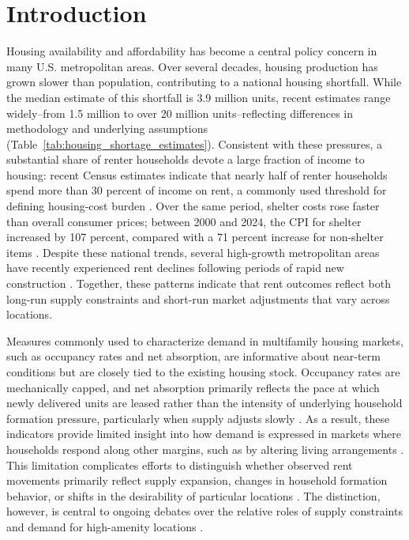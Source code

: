 \documentclass[pdflatex,sn-apa]{sn-jnl}%
\theoremstyle{thmstyleone}%
\theoremstyle{thmstyletwo}%
\theoremstyle{thmstylethree}%
\begin{document}


\maketitle


\section{Introduction}\label{sec1}
Housing availability and affordability has become a central policy concern in many U.S. metropolitan areas. Over several decades, housing production has grown slower than population, contributing to a national housing shortfall. While the median estimate of this shortfall is 3.9 million units, recent estimates range widely--from 1.5 million to over 20 million units--reflecting differences in methodology and underlying assumptions (Table~\ref{tab:housing_shortage_estimates}). Consistent with these pressures, a substantial share of renter households devote a large fraction of income to housing: recent Census estimates indicate that nearly half of renter households spend more than 30 percent of income on rent, a commonly used threshold for defining housing-cost burden \cite{censusNearlyHalf}. Over the same period, shelter costs rose faster than overall consumer prices; between 2000 and 2024, the CPI for shelter increased by 107 percent, compared with a 71 percent increase for non-shelter items \cite{stlouisfedConsumerPrice}. Despite these national trends, several high-growth metropolitan areas have recently experienced rent declines following periods of rapid new construction \cite{mott2024ThisRegion}. Together, these patterns indicate that rent outcomes reflect both long-run supply constraints and short-run market adjustments that vary across locations.

Measures commonly used to characterize demand in multifamily housing markets, such as occupancy rates and net absorption, are informative about near-term conditions but are closely tied to the existing housing stock. Occupancy rates are mechanically capped, and net absorption primarily reflects the pace at which newly delivered units are leased rather than the intensity of underlying household formation pressure, particularly when supply adjusts slowly \cite{mueller1999real}. As a result, these indicators provide limited insight into how demand is expressed in markets where households respond along other margins, such as by altering living arrangements \cite{gabriel2001rental, sirmans1991determinants, pyhrr1999real}. This limitation complicates efforts to distinguish whether observed rent movements primarily reflect supply expansion, changes in household formation behavior, or shifts in the desirability of particular locations \cite{pennington2021does, molloy2022housing}. The distinction, however, is central to ongoing debates over the relative roles of supply constraints \cite{saiz2010geographic} and demand for high-amenity locations \cite{davidoff2015supply}.
\end{document}
